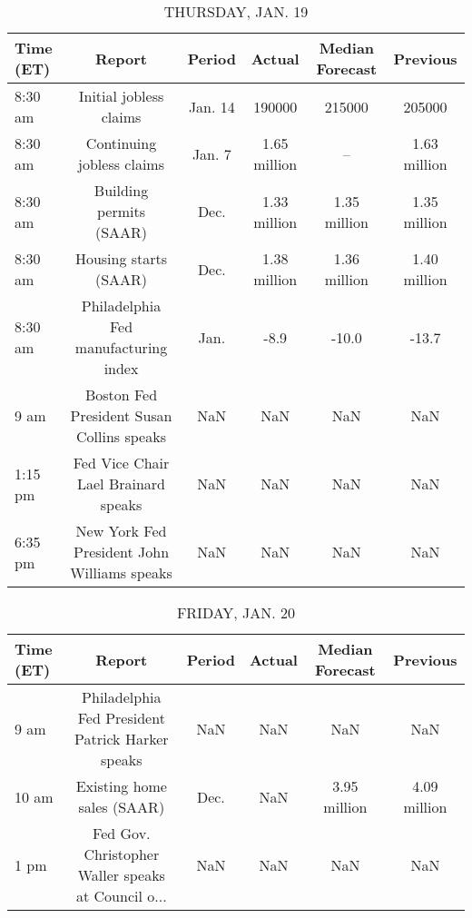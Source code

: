 \documentclass{article}%
\begin{document}
\begin{table}[htbp]%
\caption{THURSDAY, JAN. 19}%
\centering%
\begin{adjustbox}{width=1\textwidth}%
\begin{tabular}{lccccc}
\toprule
Time (ET) &                                      Report &  Period &       Actual & Median Forecast &     Previous \\
\midrule
  8:30 am &                      Initial jobless claims & Jan. 14 &       190000 &          215000 &       205000 \\
  8:30 am &                   Continuing jobless claims &  Jan. 7 & 1.65 million &              -- & 1.63 million \\
  8:30 am &                     Building permits (SAAR) &    Dec. & 1.33 million &    1.35 million & 1.35 million \\
  8:30 am &                       Housing starts (SAAR) &    Dec. & 1.38 million &    1.36 million & 1.40 million \\
  8:30 am &        Philadelphia Fed manufacturing index &    Jan. &         -8.9 &           -10.0 &        -13.7 \\
     9 am &   Boston Fed President Susan Collins speaks &     NaN &          NaN &             NaN &          NaN \\
  1:15 pm &         Fed Vice Chair Lael Brainard speaks &     NaN &          NaN &             NaN &          NaN \\
  6:35 pm & New York Fed President John Williams speaks &     NaN &          NaN &             NaN &          NaN \\
\bottomrule
\end{tabular}
%
\end{adjustbox}%
\end{table}

%


\begin{table}[htbp]%
\caption{FRIDAY, JAN. 20}%
\centering%
\begin{adjustbox}{width=1\textwidth}%
\begin{tabular}{lccccc}
\toprule
Time (ET) &                                             Report & Period & Actual & Median Forecast &     Previous \\
\midrule
     9 am &   Philadelphia Fed President Patrick Harker speaks &    NaN &    NaN &             NaN &          NaN \\
    10 am &                         Existing home sales (SAAR) &   Dec. &    NaN &    3.95 million & 4.09 million \\
     1 pm & Fed Gov. Christopher Waller speaks at Council o... &    NaN &    NaN &             NaN &          NaN \\
\bottomrule
\end{tabular}
%
\end{adjustbox}%
\end{table}
\end{document}
